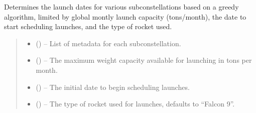 \documentclass[letterpaper,10pt,english]{sphinxmanual}
\begin{document}

\begin{fulllineitems}
\label{\detokenize{fspsim.utils:fspsim.utils.LaunchModel.global_launch_schedule}}
\pysigstartsignatures
{}
\pysigstopsignatures
\sphinxAtStartPar
Determines the launch dates for various sub\sphinxhyphen{}constellations based on a greedy algorithm, limited by
global montly launch capacity (tons/month), the date to start scheduling launches, and the type of rocket used.
\begin{quote}\begin{description}
\begin{itemize}
\item {} 
\sphinxAtStartPar
{} (\sphinxstyleliteralemphasis{\sphinxupquote{{[}}}\sphinxstyleliteralemphasis{\sphinxupquote{{]}}}) – List of metadata for each sub\sphinxhyphen{}constellation.

\item {} 
\sphinxAtStartPar
{} () – The maximum weight capacity available for launching in tons per month.

\item {} 
\sphinxAtStartPar
{} () – The initial date to begin scheduling launches.

\item {} 
\sphinxAtStartPar
{} (\sphinxstyleliteralemphasis{\sphinxupquote{, }}) – The type of rocket used for launches, defaults to “Falcon 9”.


\end{itemize}
\end{description}
\end{quote}
\end{fulllineitems}
\end{document}
